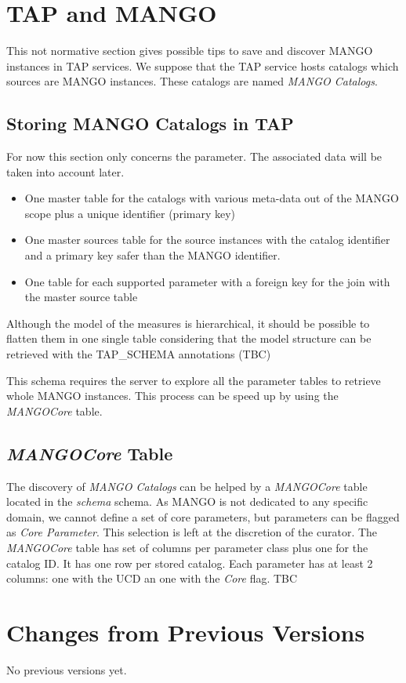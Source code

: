 \documentclass[11pt,a4paper]{ivoa}
\begin{document}


\section{TAP and MANGO}
This not normative section gives possible tips to save and discover MANGO instances in TAP services.
We suppose that the TAP service hosts catalogs which sources are MANGO instances. These catalogs are named \emph{MANGO Catalogs}.

\subsection{Storing MANGO Catalogs in TAP}
For now this section only concerns the parameter. The associated data will be taken into account later.

\begin{itemize}
  \item One master table for the catalogs with various meta-data out of the MANGO scope plus a unique identifier (primary key)
  \item One master sources table for the source instances with the catalog identifier and a primary key safer than the MANGO identifier.
  \item One table for each supported parameter with a foreign key for the join with the master source table
\end{itemize}

Although the model of the measures is hierarchical, it should be possible to flatten them in one single table considering that the model structure can be retrieved with the TAP\_SCHEMA annotations (TBC)

This schema requires the server to explore all the parameter tables to retrieve  whole MANGO instances. This process can be speed up by using the \emph{MANGOCore} table.

\subsection{ \emph{MANGOCore} Table}

The discovery of \emph{MANGO Catalogs} can be helped by a  \emph{MANGOCore} table located in the  \emph{schema} schema. As MANGO is not dedicated to any specific domain, we cannot define a set of core parameters, but parameters can be flagged as \emph{Core Parameter}. This selection is left at the discretion of the curator.
The \emph{MANGOCore} table has set of columns per parameter class plus one for the catalog ID. It has one row per stored catalog. Each parameter has at least 2 columns: one with the UCD an one with the \emph{Core} flag. TBC


\appendix
\section{Changes from Previous Versions}

No previous versions yet.



\end{document}
